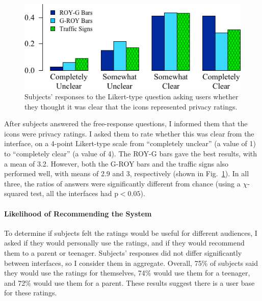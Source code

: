 \documentclass[11pt]{article}
\begin{document}
\begin{figure}
\begin{center}
\includegraphics[width=.9\linewidth]{graphs/ClarityHistLikert.png}
    \caption{Subjects' responses to the Likert-type question asking users whether they thought it was clear that the icons represented privacy ratings.}
    \label{likert}\end{center}
\end{figure}

After subjects answered the free-response questions, I informed them that 
the icons were privacy ratings. I asked them to rate whether this was 
clear from the interface, on a 4-point Likert-type scale from ``completely 
unclear'' (a value of 1) to ``completely clear'' (a value of 4).
The ROY-G bars gave the best results, with a mean of 3.2.
However, both the G-ROY bars and the traffic signs also performed well,
with means of 2.9 and 3, respectively (shown in Fig.~\ref{likert}). 
In all three, the ratios of answers were 
significantly different from chance (using a $\chi$-squared test, all the interfaces had 
$\mathrm{p}< 0.05$).

\paragraph{Likelihood of Recommending the System}
\label{ssec-est-usage}

To determine if subjects felt the ratings would be useful for 
different audiences, I asked if 
they would personally use the ratings, and if
they would recommend them to a parent or
teenager. Subjects' responses did not 
differ significantly between interfaces, so I consider 
them in aggregate. Overall, 75\% of subjects said they would use the
ratings for themselves, 
74\% would use them for a teenager, and 72\% would use them for a parent. 
These results suggest there is a user base for these ratings.
\end{document}
